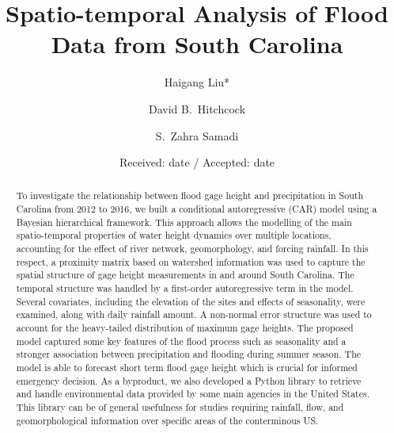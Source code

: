 \documentclass{svjour3}
\renewcommand\hl[1]{#1}
\begin{document}
\title{Spatio-temporal Analysis of Flood Data from South Carolina}

\author{Haigang Liu* \and
        David B.\ Hitchcock \and 
        S.\ Zahra Samadi 
}

\date{Received: date / Accepted: date}

\maketitle
\begin{abstract}

\hl{
To investigate the relationship between flood gage height and precipitation in South Carolina from 2012 to 2016, we built a conditional autoregressive (CAR) model using a Bayesian hierarchical framework.
This approach allows the modelling of the main spatio-temporal properties of water height dynamics over multiple locations, accounting for the effect of river network, geomorphology, and forcing rainfall.
In this respect, a proximity matrix based on watershed information was used to capture the spatial structure of gage height measurements in and around South Carolina.
The temporal structure was handled by a first-order autoregressive term in the model.
Several covariates, including the elevation of the sites and effects of seasonality, were examined, along with daily rainfall amount.
A non-normal error structure was used to account for the heavy-tailed distribution of maximum gage heights.
The proposed model captured some key features of the flood process such as seasonality and a stronger association between precipitation and flooding during summer season.
The model is able to forecast short term flood gage height which is crucial for informed emergency decision.
As a byproduct, we also developed a Python library to retrieve and handle environmental data provided by some main agencies in the United States.
This library can be of general usefulness for studies requiring rainfall, flow, and geomorphological information over specific areas of the conterminous US.\
}

\end{abstract}
\newpage
\end{document}
